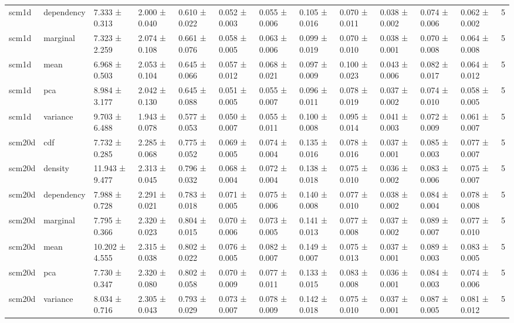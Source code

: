 \begin{table}
\begin{tabular}{llllllllllllr}
scm1d & dependency & 7.333 ± 0.313 & 2.000 ± 0.040 & 0.610 ± 0.022 & 0.052 ± 0.003 & 0.055 ± 0.006 & 0.105 ± 0.016 & 0.070 ± 0.011 & 0.038 ± 0.002 & 0.074 ± 0.006 & 0.062 ± 0.002 & 5 \\
scm1d & marginal & 7.323 ± 2.259 & 2.074 ± 0.108 & 0.661 ± 0.076 & 0.058 ± 0.005 & 0.063 ± 0.006 & 0.099 ± 0.019 & 0.070 ± 0.010 & 0.038 ± 0.001 & 0.070 ± 0.008 & 0.064 ± 0.008 & 5 \\
scm1d & mean & 6.968 ± 0.503 & 2.053 ± 0.104 & 0.645 ± 0.066 & 0.057 ± 0.012 & 0.068 ± 0.021 & 0.097 ± 0.009 & 0.100 ± 0.023 & 0.043 ± 0.006 & 0.082 ± 0.017 & 0.064 ± 0.012 & 5 \\
scm1d & pca & 8.984 ± 3.177 & 2.042 ± 0.130 & 0.645 ± 0.088 & 0.051 ± 0.005 & 0.055 ± 0.007 & 0.096 ± 0.011 & 0.078 ± 0.019 & 0.037 ± 0.002 & 0.074 ± 0.010 & 0.058 ± 0.005 & 5 \\
scm1d & variance & 9.703 ± 6.488 & 1.943 ± 0.078 & 0.577 ± 0.053 & 0.050 ± 0.007 & 0.055 ± 0.011 & 0.100 ± 0.008 & 0.095 ± 0.014 & 0.041 ± 0.003 & 0.072 ± 0.009 & 0.061 ± 0.007 & 5 \\
scm20d & cdf & 7.732 ± 0.285 & 2.285 ± 0.068 & 0.775 ± 0.052 & 0.069 ± 0.005 & 0.074 ± 0.004 & 0.135 ± 0.016 & 0.078 ± 0.016 & 0.037 ± 0.001 & 0.085 ± 0.003 & 0.077 ± 0.007 & 5 \\
scm20d & density & 11.943 ± 9.477 & 2.313 ± 0.045 & 0.796 ± 0.032 & 0.068 ± 0.004 & 0.072 ± 0.004 & 0.138 ± 0.018 & 0.075 ± 0.010 & 0.036 ± 0.002 & 0.083 ± 0.006 & 0.075 ± 0.007 & 5 \\
scm20d & dependency & 7.988 ± 0.728 & 2.291 ± 0.021 & 0.783 ± 0.018 & 0.071 ± 0.005 & 0.075 ± 0.006 & 0.140 ± 0.008 & 0.077 ± 0.010 & 0.038 ± 0.002 & 0.084 ± 0.004 & 0.078 ± 0.008 & 5 \\
scm20d & marginal & 7.795 ± 0.366 & 2.320 ± 0.023 & 0.804 ± 0.015 & 0.070 ± 0.006 & 0.073 ± 0.005 & 0.141 ± 0.013 & 0.077 ± 0.008 & 0.037 ± 0.002 & 0.089 ± 0.007 & 0.077 ± 0.010 & 5 \\
scm20d & mean & 10.202 ± 4.555 & 2.315 ± 0.038 & 0.802 ± 0.022 & 0.076 ± 0.005 & 0.082 ± 0.007 & 0.149 ± 0.007 & 0.075 ± 0.013 & 0.037 ± 0.001 & 0.089 ± 0.003 & 0.083 ± 0.005 & 5 \\
scm20d & pca & 7.730 ± 0.347 & 2.320 ± 0.080 & 0.802 ± 0.058 & 0.070 ± 0.009 & 0.077 ± 0.011 & 0.133 ± 0.015 & 0.083 ± 0.008 & 0.036 ± 0.001 & 0.084 ± 0.003 & 0.074 ± 0.006 & 5 \\
scm20d & variance & 8.034 ± 0.716 & 2.305 ± 0.043 & 0.793 ± 0.029 & 0.073 ± 0.007 & 0.078 ± 0.009 & 0.142 ± 0.018 & 0.075 ± 0.010 & 0.037 ± 0.001 & 0.087 ± 0.005 & 0.081 ± 0.012 & 5 \\

\end{tabular}
\end{table}
